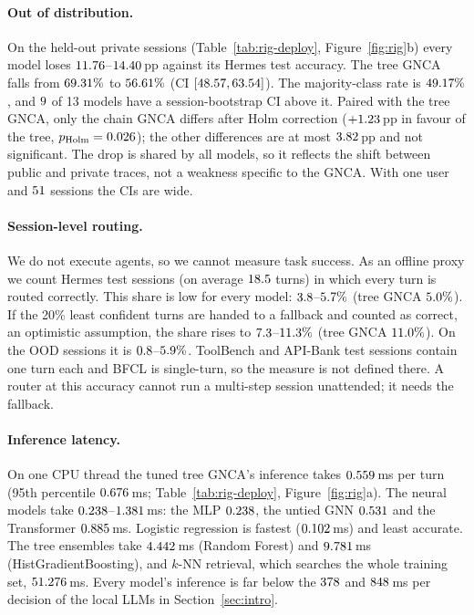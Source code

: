 \documentclass[10pt,twocolumn,letterpaper]{article}
\begin{document}
\paragraph{Out of distribution.} On the held-out private sessions (Table~\ref{tab:rig-deploy}, Figure~\ref{fig:rig}b) every model loses $11.76$--$14.40$\,pp against its Hermes test accuracy. The tree GNCA falls from $69.31\%$ to $56.61\%$ (CI $[48.57, 63.54]$). The majority-class rate is $49.17\%$, and $9$ of 13 models have a session-bootstrap CI above it. Paired with the tree GNCA, only the chain GNCA differs after Holm correction ($+1.23$\,pp in favour of the tree, $p_{\text{Holm}}=0.026$); the other differences are at most $3.82$\,pp and not significant. The drop is shared by all models, so it reflects the shift between public and private traces, not a weakness specific to the GNCA. With one user and $51$ sessions the CIs are wide.

\paragraph{Session-level routing.} We do not execute agents, so we cannot measure task success. As an offline proxy we count Hermes test sessions (on average $18.5$ turns) in which every turn is routed correctly. This share is low for every model: $3.8$--$5.7\%$ (tree GNCA $5.0\%$). If the 20\% least confident turns are handed to a fallback and counted as correct, an optimistic assumption, the share rises to $7.3$--$11.3\%$ (tree GNCA $11.0\%$). On the OOD sessions it is $0.8$--$5.9\%$. ToolBench and API-Bank test sessions contain one turn each and BFCL is single-turn, so the measure is not defined there. A router at this accuracy cannot run a multi-step session unattended; it needs the fallback.

\paragraph{Inference latency.} On one CPU thread the tuned tree GNCA's inference takes $0.559$\,ms per turn (95th percentile $0.676$\,ms; Table~\ref{tab:rig-deploy}, Figure~\ref{fig:rig}a). The neural models take $0.238$--$1.381$\,ms: the MLP $0.238$, the untied GNN $0.531$ and the Transformer $0.885$\,ms. Logistic regression is fastest ($0.102$\,ms) and least accurate. The tree ensembles take $4.442$\,ms (Random Forest) and $9.781$\,ms (HistGradientBoosting), and $k$-NN retrieval, which searches the whole training set, $51.276$\,ms. Every model's inference is far below the $378$ and $848$\,ms per decision of the local LLMs in Section~\ref{sec:intro}.
\end{document}
